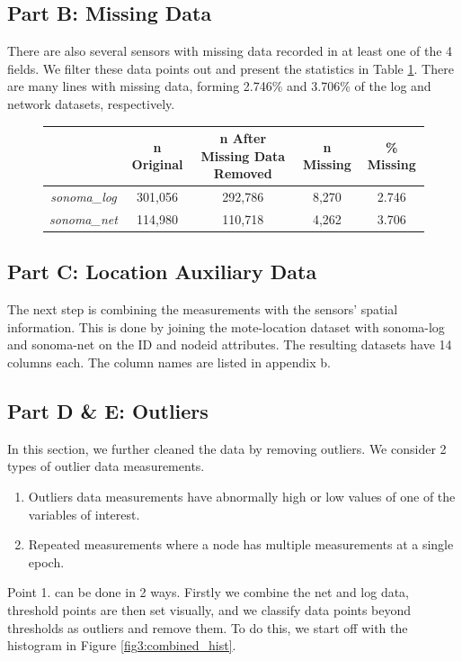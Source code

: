 \documentclass[11pt, letterpaper]{article}
\begin{document}
\subsection{Part B: Missing Data}
There are also several sensors with missing data recorded in at least one of the 4 fields. We filter these data points out and present the statistics in Table \ref{table:data_info}. There are many lines with missing data, forming 2.746\% and 3.706\% of the log and network datasets, respectively.

\begin{figure}[h!]
\captionsetup{justification=centering}
\centering
\begin{tabular}{ |c|c|c|c|c| } 
    \hline & n Original & n After Missing Data Removed & n Missing & \% Missing \\
    \hline
    \textit{sonoma\_log} & 301,056 & 292,786 & 8,270 &2.746\\ 
    \textit{sonoma\_net}  & 114,980 & 110,718 & 4,262 & 3.706\\
    \hline
\end{tabular}
\label{table:data_info}
\end{figure}

\subsection{Part C: Location Auxiliary Data}
The next step is combining the measurements with the sensors' spatial information. This is done by joining the mote-location dataset with sonoma-log and sonoma-net on the ID and nodeid attributes. The resulting datasets have 14 columns each. The column names are listed in appendix b.


\subsection{Part D \& E: Outliers}
In this section, we further cleaned the data by removing outliers. We consider 2 types of outlier data measurements. 
\begin{enumerate}
    \item Outliers data measurements have abnormally high or low values of one of the variables of interest.
    \item Repeated measurements where a node has multiple measurements at a single epoch.
\end{enumerate}
Point 1. can be done in 2 ways. Firstly we combine the net and log data, threshold points are then set visually, and we classify data points beyond thresholds as outliers and remove them. To do this, we start off with the histogram in Figure \ref{fig3:combined_hist}. 
\end{document}
